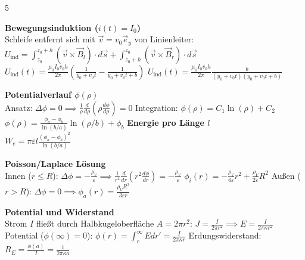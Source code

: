 \documentclass[a4paper, 2pt, landscape]{extarticle}
\begin{document}
\begin{multicols*}{5}
\begin{tcolorbox}[title={Induktion: Bewegte Schleife (Blatt 7)}, colback=white, colframe=black]
\textbf{Bewegungsinduktion ($i(t) = I_0$)} \\
Schleife entfernt sich mit $\vec{v} = v_0 \vec{e}_y$ von Linienleiter:
$U_{\text{ind}} = \int_{z_0}^{z_0+h} (\vec{v} \times \vec{B}_l) \cdot d\vec{s} + \int_{z_0+h}^{z_0} (\vec{v} \times \vec{B}_r) \cdot d\vec{s}$
$U_{\text{ind}}(t) = \frac{\mu_0 I_0 v_0 h}{2\pi} \left( \frac{1}{y_0 + v_0 t} - \frac{1}{y_0 + v_0 t + b} \right)$
$U_{\text{ind}}(t) = \frac{\mu_0 I_0 v_0 h}{2\pi} \frac{b}{(y_0+v_0t)(y_0+v_0t+b)}$
\end{tcolorbox}

\begin{tcolorbox}[title={Zylinderkondensator: Laplace-Lösung (Blatt 4)}, colback=white, colframe=black]
\textbf{Potentialverlauf $\phi(\rho)$} \\
Ansatz: $\Delta \phi = 0 \implies \frac{1}{\rho} \frac{d}{d\rho} (\rho \frac{d\phi}{d\rho}) = 0$
Integration: $\phi(\rho) = C_1 \ln(\rho) + C_2$
$\phi(\rho) = \frac{\phi_a - \phi_b}{\ln(b/a)} \ln(\rho/b) + \phi_b$
\textbf{Energie pro Länge $l$} \\
$W_e = \pi \varepsilon l \frac{(\phi_a - \phi_b)^2}{\ln(b/a)}$
\end{tcolorbox}

\begin{tcolorbox}[title={Elektrostatik: Homogene Kugelladung (Blatt 4)}, colback=white, colframe=black]
\textbf{Poisson/Laplace Lösung} \\
Innen ($r \le R$): $\Delta \phi = -\frac{\rho_V}{\varepsilon} \implies \frac{1}{r^2} \frac{d}{dr}(r^2 \frac{d\phi}{dr}) = -\frac{\rho_V}{\varepsilon}$
$\phi_i(r) = -\frac{\rho_V}{6\varepsilon} r^2 + \frac{\rho_V}{2\varepsilon} R^2$
Außen ($r > R$): $\Delta \phi = 0 \implies \phi_a(r) = \frac{\rho_V R^3}{3\varepsilon r}$
\end{tcolorbox}

\begin{tcolorbox}[title={Strömungsfeld: Halbkugelerder (Blatt 5)}, colback=white, colframe=black]
\textbf{Potential und Widerstand} \\
Strom $I$ fließt durch Halbkugeloberfläche $A = 2\pi r^2$:
$J = \frac{I}{2\pi r^2} \implies E = \frac{I}{2\pi \kappa r^2}$
Potential ($\phi(\infty)=0$): $\phi(r) = \int_{r}^{\infty} E dr' = \frac{I}{2\pi \kappa r}$
Erdungswiderstand: $R_E = \frac{\phi(a)}{I} = \frac{1}{2\pi \kappa a}$
\end{tcolorbox}


\end{multicols*}
\end{document}

